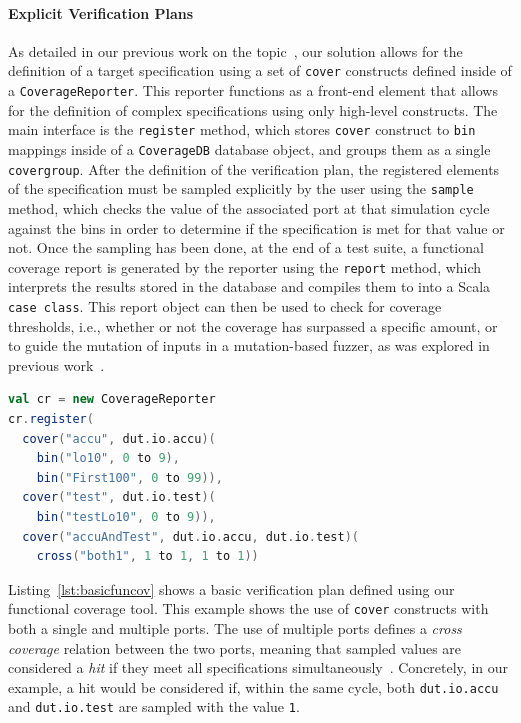 \documentclass[conference]{IEEEtran}
\begin{document}
\paragraph{Explicit Verification Plans} As detailed in our previous work on the topic~\cite{dobisCoverage:ETS22}, our solution allows for the definition of a target specification using a set of \texttt{cover} constructs defined inside of a \texttt{CoverageReporter}.
This reporter functions as a front-end element that allows for the definition of complex specifications using only high-level constructs.
The main interface is the \texttt{register} method, which stores \texttt{cover} construct to \texttt{bin} mappings inside of a \texttt{CoverageDB} database object, and groups them as a single \texttt{covergroup}.
After the definition of the verification plan, the registered elements of the specification must be sampled explicitly by the user using the \texttt{sample} method, which checks the value of the associated port at that simulation cycle against the bins in order to determine if the specification is met for that value or not.
Once the sampling has been done, at the end of a test suite, a functional coverage report is generated by the reporter using the \texttt{report} method, which interprets the results stored in the database and compiles them to into a Scala \texttt{case class}. 
This report object can then be used to check for coverage thresholds, i.e., whether or not the coverage has surpassed a specific amount, or to guide the mutation of inputs in a mutation-based fuzzer, as was explored in previous work~\cite{verify:fuzzing:2021}.

\begin{lstlisting}[captionpos=b,caption={Small Verification Plan defined using 3 \texttt{cover} constructs, including one cross coverage construct},label={lst:basicfuncov},language=scala]
val cr = new CoverageReporter
cr.register(
  cover("accu", dut.io.accu)(
    bin("lo10", 0 to 9),
    bin("First100", 0 to 99)),
  cover("test", dut.io.test)(
    bin("testLo10", 0 to 9)),
  cover("accuAndTest", dut.io.accu, dut.io.test)(
    cross("both1", 1 to 1, 1 to 1))
\end{lstlisting}

Listing~\ref{lst:basicfuncov} shows a basic verification plan defined using our functional coverage tool. 
This example shows the use of \texttt{cover} constructs with both a single and multiple ports. 
The use of multiple ports defines a \textit{cross coverage} relation between the two ports, meaning that sampled values are considered a \emph{hit} if they meet all specifications simultaneously~\cite{spear2008systemverilog}.
Concretely, in our example, a hit would be considered if, within the same cycle, both \texttt{dut.io.accu} and \texttt{dut.io.test} are sampled with the value \texttt{1}. 
\end{document}
